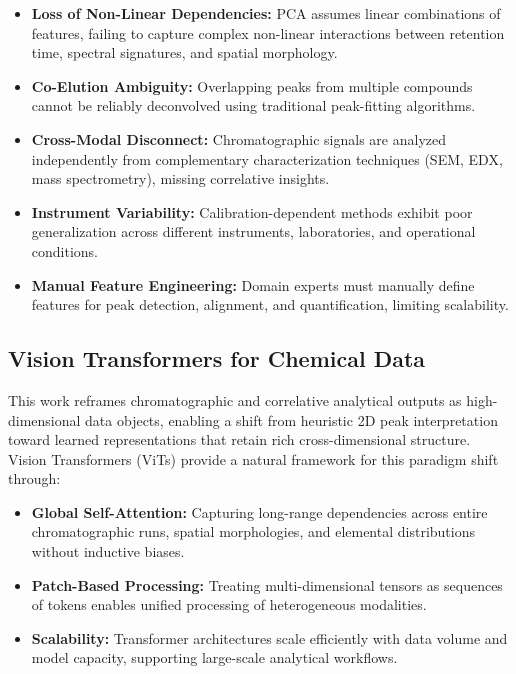\documentclass[12pt,a4paper]{article}
\begin{document}
\begin{itemize}
    \item \textbf{Loss of Non-Linear Dependencies:} PCA assumes linear combinations of features, failing to capture complex non-linear interactions between retention time, spectral signatures, and spatial morphology.
    \item \textbf{Co-Elution Ambiguity:} Overlapping peaks from multiple compounds cannot be reliably deconvolved using traditional peak-fitting algorithms.
    \item \textbf{Cross-Modal Disconnect:} Chromatographic signals are analyzed independently from complementary characterization techniques (SEM, EDX, mass spectrometry), missing correlative insights.
    \item \textbf{Instrument Variability:} Calibration-dependent methods exhibit poor generalization across different instruments, laboratories, and operational conditions.
    \item \textbf{Manual Feature Engineering:} Domain experts must manually define features for peak detection, alignment, and quantification, limiting scalability.
\end{itemize}

\subsection{Vision Transformers for Chemical Data}

This work reframes chromatographic and correlative analytical outputs as high-dimensional data objects, enabling a shift from heuristic 2D peak interpretation toward learned representations that retain rich cross-dimensional structure. Vision Transformers (ViTs) \cite{dosovitskiy2021image} provide a natural framework for this paradigm shift through:

\begin{itemize}
    \item \textbf{Global Self-Attention:} Capturing long-range dependencies across entire chromatographic runs, spatial morphologies, and elemental distributions without inductive biases.
    \item \textbf{Patch-Based Processing:} Treating multi-dimensional tensors as sequences of tokens enables unified processing of heterogeneous modalities.
    \item \textbf{Scalability:} Transformer architectures scale efficiently with data volume and model capacity, supporting large-scale analytical workflows.
\end{itemize}
\end{document}
